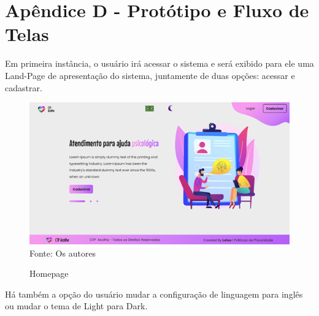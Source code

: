 \documentclass[12pt,a4paper]{article}
\begin{document}
\newpage

\section{Apêndice D - Protótipo e Fluxo de Telas}
Em primeira instância, o usuário irá acessar o sistema e será exibido para ele uma Land-Page de apresentação do sistema, juntamente de duas opções: acessar e cadastrar.

\begin{figure}[H]
    \centering
    \caption{Homepage}
     \includegraphics[width=15cm]{prot.png}
     Fonte: Os autores
\end{figure}

Há também a opção do usuário mudar a configuração de linguagem para inglês ou mudar o tema de \gls{Light} para \gls{Dark}. 

\newpage
\end{document}
